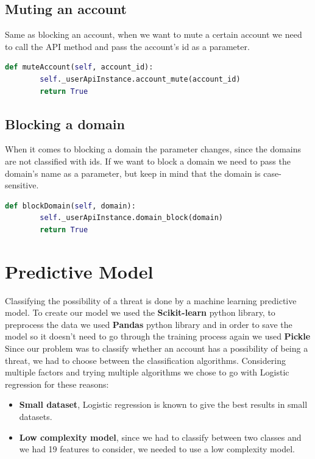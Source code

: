 \subsection{Muting an account}
Same as blocking an account, when we want to mute a certain account we need to call the API method and pass the account's id as a parameter.
\\[5pt]
\begin{lstlisting}[language=python, caption={Muting an account method}, captionpos=b]
	def muteAccount(self, account_id):
		self._userApiInstance.account_mute(account_id)
		return True
\end{lstlisting}
\subsection{Blocking a domain}
When it comes to blocking a domain the parameter changes, since the domains are not classified with ids. If we want to block a domain we need to pass the domain's name as a parameter, but keep in mind that the domain is case-sensitive.
\\[5pt]
\begin{lstlisting}[language=python, caption={Blockin a domain method}, captionpos=b]
	def blockDomain(self, domain):
		self._userApiInstance.domain_block(domain)
		return True
\end{lstlisting}

\section{Predictive Model}\label{s:model}
Classifying the possibility of a threat is done by a machine learning predictive model.
To create our model we used the \textbf{Scikit-learn} \cite{scikit-learn} python library, to
preprocess the data we used \textbf{Pandas} \cite{pandas} python library and in order to save the
model so it doesn't need to go through the training process again we used \textbf{Pickle} \cite{pickle}
\\[5pt]
Since our problem was to classify whether an account has a possibility of being a threat,
we had to choose between the classification algorithms. Considering multiple factors and trying
multiple algorithms we chose to go with Logistic regression for these reasons:
\begin{itemize}
	\item \textbf{Small dataset}, Logistic regression is known to give the best results in small datasets.
	\item \textbf{Low complexity model}, since we had to classify between two classes and we had 19 features to consider,
	we needed to use a low complexity model.
\end{itemize}
